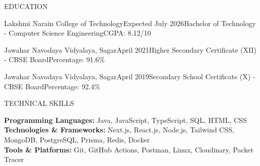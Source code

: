 \documentclass{resume}
\begin{document}
\begin{rSection}{EDUCATION}

\begin{rEducation}{Lakshmi Narain College of Technology}{Expected July 2026}{Bachelor of Technology - Computer Science Engineering}{CGPA: 8.12/10}
\end{rEducation}

\begin{rEducation}{Jawahar Navodaya Vidyalaya, Sagar}{April 2021}{Higher Secondary Certificate (XII) - CBSE Board}{Percentage: 91.6\%}
\end{rEducation}

\begin{rEducation}{Jawahar Navodaya Vidyalaya, Sagar}{April 2019}{Secondary School Certificate (X) - CBSE Board}{Percentage: 92.4\%}
\end{rEducation}

\end{rSection}

\begin{rSection}{TECHNICAL SKILLS}

\textbf{Programming Languages:} Java, JavaScript, TypeScript, SQL, HTML, CSS \\[2pt]
\textbf{Technologies \& Frameworks:} Next.js, React.js, Node.js, Tailwind CSS, MongoDB, PostgreSQL, Prisma, Redis, Docker \\[2pt]
\textbf{Tools \& Platforms:} Git, GitHub Actions, Postman, Linux, Cloudinary, Packet Tracer

\end{rSection}
\end{document}
